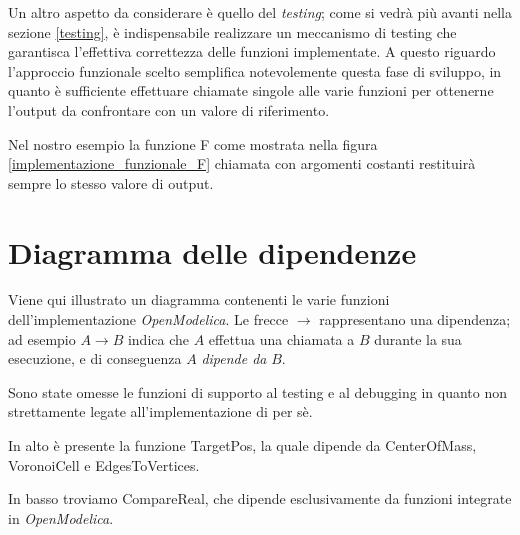 \documentclass[11pt,a4paper]{report}
\newcommand{\name}[1]{{\ttfamily #1}}
\begin{document}
Un altro aspetto da considerare è quello del \textit{testing}; come si vedrà più  avanti nella sezione \ref{testing}, è indispensabile realizzare un meccanismo di testing che garantisca l'effettiva correttezza delle funzioni implementate. A questo riguardo l'approccio funzionale scelto semplifica notevolemente questa fase di sviluppo, in quanto è sufficiente effettuare chiamate singole alle varie funzioni per ottenerne l'output da confrontare con un valore di riferimento.

Nel nostro esempio la funzione \name{F} come mostrata nella figura \ref{implementazione_funzionale_F} chiamata con argomenti costanti restituirà sempre lo stesso valore di output.

\section{Diagramma delle dipendenze}

Viene qui illustrato un diagramma contenenti le varie funzioni dell'implementazione \textit{OpenModelica}. Le frecce $\longrightarrow$ rappresentano una dipendenza; ad esempio $A \longrightarrow B$ indica che $A$ effettua una chiamata a $B$ durante la sua esecuzione, e di conseguenza $A$ \textit{dipende da} $B$.

Sono state omesse le funzioni di supporto al testing e al debugging in quanto non strettamente legate all'implementazione di per sè.

In alto è presente la funzione \name{TargetPos}, la quale dipende da \name{CenterOfMass}, \name{VoronoiCell} e \name{EdgesToVertices}.

In basso troviamo \name{CompareReal}, che dipende esclusivamente da funzioni integrate in \textit{OpenModelica}.
\end{document}
